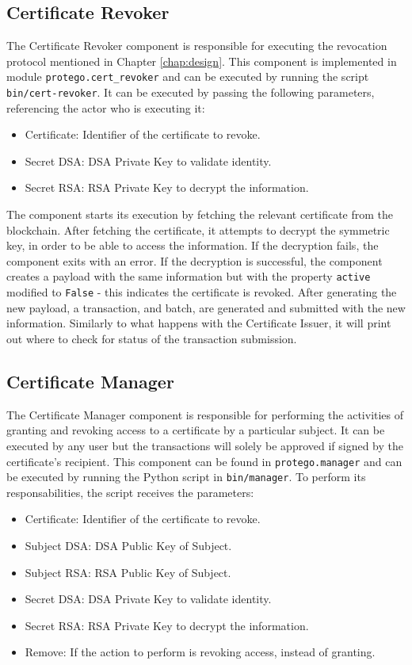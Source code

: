 \subsection{Certificate Revoker}

The Certificate Revoker component is responsible for executing the revocation protocol mentioned in Chapter \ref{chap:design}. This component is implemented in module \texttt{protego.cert\_revoker} and can be executed by running the script \texttt{bin/cert-revoker}. It can be executed by passing the following parameters, referencing the actor who is executing it:

\begin{itemize}
	\item Certificate: Identifier of the certificate to revoke.
	\item Secret DSA: DSA Private Key to validate identity.
	\item Secret RSA: RSA Private Key to decrypt the information.
\end{itemize}

The component starts its execution by fetching the relevant certificate from the blockchain. After fetching the certificate, it attempts to decrypt the symmetric key, in order to be able to access the information. If the decryption fails, the component exits with an error. If the decryption is successful, the component creates a payload with the same information but with the property \texttt{active} modified to \texttt{False} - this indicates the certificate is revoked. After generating the new payload, a transaction, and batch, are generated and submitted with the new information. Similarly to what happens with the Certificate Issuer, it will print out where to check for status of the transaction submission.

\subsection{Certificate Manager}

The Certificate Manager component is responsible for performing the activities of granting and revoking access to a certificate by a particular subject. It can be executed by any user but the transactions will solely be approved if signed by the certificate's recipient. This component can be found in \texttt{protego.manager} and can be executed by running the Python script in \texttt{bin/manager}. To perform its responsabilities, the script receives the parameters:

\begin{itemize}
	\item Certificate: Identifier of the certificate to revoke.
	\item Subject DSA: DSA Public Key of Subject.
	\item Subject RSA: RSA Public Key of Subject.
	\item Secret DSA: DSA Private Key to validate identity.
	\item Secret RSA: RSA Private Key to decrypt the information.
	\item Remove: If the action to perform is revoking access, instead of granting.
\end{itemize}

